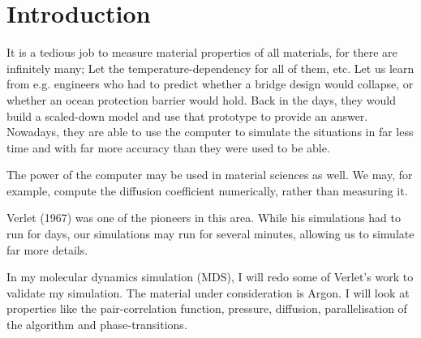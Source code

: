 \section{Introduction}
It is a tedious job to measure material properties of all materials, for
there are infinitely many; Let the temperature-dependency for all of them, etc.
Let us learn from e.g. engineers who had to predict whether a bridge design
would collapse, or whether an ocean protection barrier would hold.
Back in the days, they would build a scaled-down model and use that
prototype to provide an answer. Nowadays, they are able to use the computer to
simulate the situations in far less time and with far more accuracy than they
were used to be able.

The power of the computer may be used in material sciences as well. We may, for
example, compute the diffusion coefficient numerically, rather than measuring
it.

Verlet (1967) \cite{verlet:firstPaper} was one of the pioneers in this area.
While his simulations had to run for days, our simulations may run for several
minutes, allowing us to simulate far more details.

In my molecular dynamics simulation (MDS), I will redo some of Verlet's work to
validate my simulation. The material under consideration is Argon. I will look
at properties like the pair-correlation function, pressure, diffusion,
parallelisation of the algorithm and phase-transitions.




% 
% 
